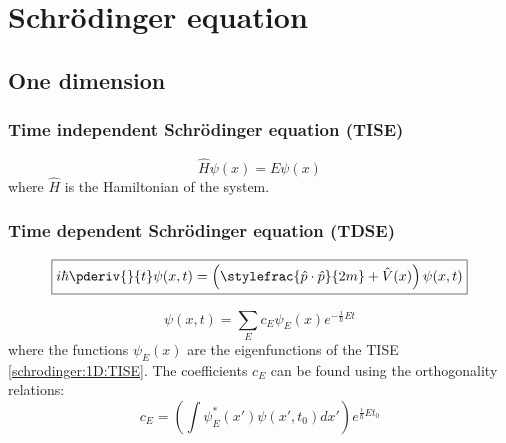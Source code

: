 \chapter{Schr\"odinger equation}

\section{One dimension}
\subsection{Time independent Schr\"odinger equation (TISE)}

	\begin{formula}[TISE]
		\begin{equation}
			\label{schrodinger:1D:TISE}
		        \boxed{\hat{H}\psi(x) = E\psi(x)}
		\end{equation}
		where $\hat{H}$ is the Hamiltonian of the system.
	\end{formula}
    

\subsection{Time dependent Schr\"odinger equation (TDSE)}
	
	\begin{formula}
		\begin{equation}
			\label{schrodinger:1D:TDSE_position}
        		\boxed{i\hbar\pderiv{}{t}\psi(x, t) = \left(\stylefrac{\hat{p}\cdot\hat{p}}{2m} + \hat{V}(x)\right)\psi(x, t)}
		\end{equation}
	\end{formula}
	
	\begin{formula}
		\begin{equation}
			\label{schrodinger:1D:general_solution}
		        \boxed{\psi(x, t) = \sum_Ec_E\psi_E(x)e^{-\frac{i}{\hbar}Et}}
		\end{equation}
	        where the functions $\psi_E(x)$ are the eigenfunctions of the TISE \ref{schrodinger:1D:TISE}. The coefficients $c_E$ can be found using the orthogonality relations:
        	\begin{equation}
			\label{schrodinger:1D:general_solution_coefficients}
        		c_E=\left(\int\psi_E^*(x')\psi(x', t_0)dx'\right)e^{\frac{i}{\hbar}Et_0}
		\end{equation}
	\end{formula}

